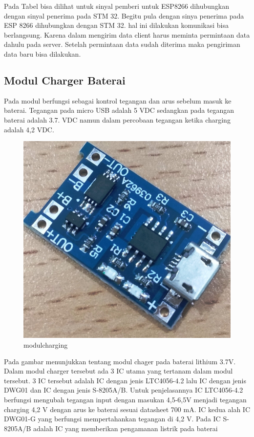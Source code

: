 \documentclass[11pt]{article}
\begin{document}
Pada Tabel bisa dilihat untuk sinyal pemberi untuk ESP8266 dihubungkan dengan sinyal penerima pada STM 32.
Begitu pula dengan sinya penerima pada ESP 8266 dihubungkan dengan STM 32. hal ini dilakukan komunikasi bisa berlangsung.
Karena dalam mengirim data client harus meminta permintaan data dahulu pada server.
Setelah permintaan data sudah diterima maka pengiriman data baru bisa dilakukan.
\subsection{Modul Charger Baterai}
Pada modul berfungsi sebagai kontrol tegangan dan arus sebelum masuk ke baterai.
Tegangan pada micro USB adalah 5 VDC sedangkan pada tegangan  baterai adalah 3.7.
VDC namun dalam percobaan tegangan ketika charging adalah 4,2 VDC.
\begin{figure}[!h]
	\centering
	\captionsetup{justification=centering}
	\includegraphics[width=0.7\linewidth]{dokumentasi/modulcharging.jpg}
	\caption[modulcharging]{\small{modulcharging}}
\end{figure}
Pada gambar menunjukkan tentang modul chager pada baterai lithium 3.7V.
Dalam modul charger tersebut ada 3 IC utama yang tertanam dalam modul tersebut.\cite{For2011}
3 IC tersebut adalah  IC dengan jenis LTC4056-4.2 lalu IC dengan jenis DWG01 dan IC dengan jenis S-8205A/B.
Untuk penjelasannya IC  LTC4056-4.2 berfungsi mengubah tegangan input dengan masukan 4,5-6,5V menjadi tegangan charging 4,2 V dengan arus ke baterai sesuai datasheet 700 mA\cite{LTC2018}.
IC kedua alah IC DWG01-G yang berfungsi mempertahankan tegangan di 4,2 V\cite{For2011}.
Pada IC S-8205A/B adalah IC yang memberikan pengamanan listrik pada baterai\cite{Ic2016}
\end{document}
